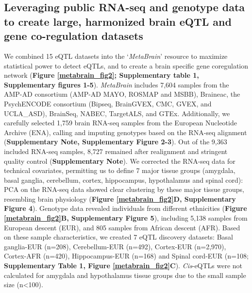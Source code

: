 \subsection{Leveraging public RNA-seq and genotype data to create large, harmonized brain eQTL and gene co-regulation datasets}
We combined 15 eQTL datasets into the ‘\textit{MetaBrain}’ resource to maximize statistical power to detect eQTLs, and to create a brain specific gene coregulation network (\textbf{Figure \ref{metabrain_fig2}; Supplementary table 1, Supplementary figures 1-5}). \textit{MetaBrain} includes 7,604 samples from the AMP-AD consortium\cite{hodesAcceleratingMedicinesPartnership2016} (AMP-AD MAYO\cite{hodesAcceleratingMedicinesPartnership2016}, ROSMAP\cite{hodesAcceleratingMedicinesPartnership2016} and MSBB\cite{hodesAcceleratingMedicinesPartnership2016}), Braineac\cite{ramasamyGeneticVariabilityRegulation2014}, the PsychENCODE consortium\cite{consortium*RevealingBrainMolecular2018} (Bipseq\cite{wangComprehensiveFunctionalGenomic2018}, BrainGVEX\cite{wangComprehensiveFunctionalGenomic2018}, CMC\cite{fromerGeneExpressionElucidates2016}, GVEX, and UCLA\_ASD\cite{wangComprehensiveFunctionalGenomic2018}), BrainSeq\cite{brainseq2015}, NABEC\cite{gibbsAbundantQuantitativeTrait2010}, TargetALS\cite{prudencioDistinctBrainTranscriptome2015}, and GTEx\cite{donovanCellularDeconvolutionGTEx2020}. Additionally, we carefully selected 1,759 brain RNA-seq samples from the European Nucleotide Archive (ENA)\cite{leinonenEuropeanNucleotideArchive2011}, calling and imputing genotypes based on the RNA-seq alignment (\textbf{Supplementary Note, Supplementary Figure 2-3}). Out of the 9,363 included RNA-seq samples, 8,727 remained after realignment and stringent quality control (\textbf{Supplementary Note}). We corrected the RNA-seq data for technical covariates, permitting us to define 7 major tissue groups (amygdala, basal ganglia, cerebellum, cortex, hippocampus, hypothalamus and spinal cord): PCA on the RNA-seq data showed clear clustering by these major tissue groups, resembling brain physiology (\textbf{Figure \ref{metabrain_fig2}D, Supplementary Figure 4}). Genotype data revealed individuals from different ethnicities (\textbf{Figure \ref{metabrain_fig2}B, Supplementary Figure 5}), including 5,138 samples from European descent (EUR), and 805 samples from African descent (AFR). Based on these sample characteristics, we created 7 eQTL discovery datasets: Basal ganglia-EUR (n=208), Cerebellum-EUR (n=492), Cortex-EUR (n=2,970), Cortex-AFR (n=420), Hippocampus-EUR (n=168) and Spinal cord-EUR (n=108; \textbf{Supplementary Table 1, Figure \ref{metabrain_fig2}C}). \emph{Cis}-eQTLs were not calculated for amygdala and hypothalamus tissue groups due to the small sample size (n<100). 


